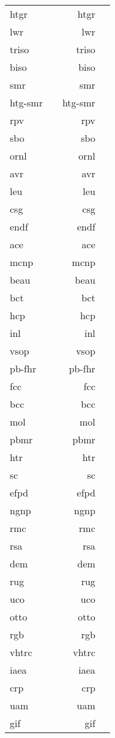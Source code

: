 \begin{longtable}{p{25mm} p{50mm} rp{75mm}}
\acrshort{htgr} & & \acrlong{htgr} \\
\acrshort{lwr} & & \acrlong{lwr} \\
\acrshort{triso} & & \acrlong{triso} \\
\acrshort{biso} & & \acrlong{biso} \\
\acrshort{smr} & & \acrlong{smr} \\
\acrshort{htg-smr} & & \acrlong{htg-smr} \\
\acrshort{rpv} & & \acrlong{rpv} \\
\acrshort{sbo} & & \acrlong{sbo} \\
\acrshort{ornl} & & \acrlong{ornl} \\
\acrshort{avr} & & \acrlong{avr} \\
\acrshort{leu} & & \acrlong{leu} \\
\acrshort{csg} & & \acrlong{csg} \\
\acrshort{endf} & & \acrlong{endf} \\
\acrshort{ace} & & \acrlong{ace} \\
\acrshort{mcnp} & & \acrlong{mcnp} \\
\acrshort{beau} & & \acrlong{beau} \\
\acrshort{bct} & & \acrlong{bct} \\
\acrshort{hcp} & & \acrlong{hcp} \\
\acrshort{inl} & & \acrlong{inl} \\
\acrshort{vsop} & & \acrlong{vsop} \\
\acrshort{pb-fhr} & & \acrlong{pb-fhr} \\
\acrshort{fcc} & & \acrlong{fcc} \\
\acrshort{bcc} & & \acrlong{bcc} \\
\acrshort{mol} & & \acrlong{mol} \\
\acrshort{pbmr} & & \acrlong{pbmr} \\
\acrshort{htr} & & \acrlong{htr} \\
\acrshort{sc} & & \acrlong{sc} \\
\acrshort{efpd} & & \acrlong{efpd} \\
\acrshort{ngnp} & & \acrlong{ngnp} \\
\acrshort{rmc} & & \acrlong{rmc} \\
\acrshort{rsa} & & \acrlong{rsa} \\
\acrshort{dem} & & \acrlong{dem} \\
\acrshort{rug} & & \acrlong{rug} \\
\acrshort{uco} & & \acrlong{uco} \\
\acrshort{otto} & & \acrlong{otto} \\
\acrshort{rgb} & & \acrlong{rgb} \\
\acrshort{vhtrc} & & \acrlong{vhtrc} \\
\acrshort{iaea} & & \acrlong{iaea} \\
\acrshort{crp} & & \acrlong{crp} \\
\acrshort{uam} & & \acrlong{uam} \\
\acrshort{gif} & & \acrlong{gif}
\end{longtable}
